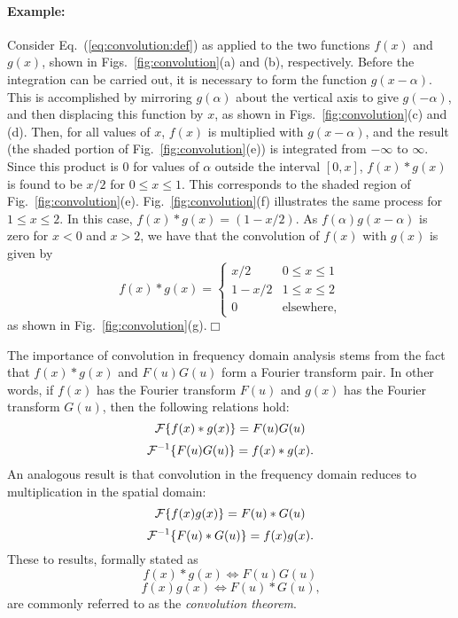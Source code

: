 \paragraph{Example:} Consider Eq.~(\ref{eq:convolution:def}) as applied
to the two functions $f(x)$ and $g(x)$, shown in
Figs.~\ref{fig:convolution}(a) and (b), respectively.  Before the
integration can be carried out, it is necessary to form the function
$g(x-\alpha)$.  This is accomplished by mirroring $g(\alpha)$ about
the vertical axis to give $g(-\alpha)$, and then displacing this
function by $x$, as shown in Figs.~\ref{fig:convolution}(c) and (d).
Then, for all values of $x$, $f(x)$ is multiplied with $g(x-\alpha)$,
and the result (the shaded portion of Fig.~\ref{fig:convolution}(e))
is integrated from $-\infty$ to $\infty$.  Since this product is $0$
for values of $\alpha$ outside the interval $[0,x]$, $f(x)\ast g(x)$
is found to be $x/2$ for $0\leq x\leq 1$.  This corresponds to the
shaded region of Fig.~\ref{fig:convolution}(e).
Fig.~\ref{fig:convolution}(f) illustrates the same process for $1\leq
x\leq 2$.  In this case, $f(x)\ast g(x)=(1-x/2)$.  As
$f(\alpha)g(x-\alpha)$ is zero for $x<0$ and $x>2$, we have that the
convolution of $f(x)$ with $g(x)$ is given by
\begin{equation}
  f(x)\ast g(x)=\left\{\begin{array}{ll}
                         x/2   & 0\leq x\leq 1 \\
                         1-x/2 & 1\leq x\leq 2 \\
                         0     & \mbox{elsewhere,}
                       \end{array}\right.
\end{equation}
as shown in Fig.~\ref{fig:convolution}(g).\hfill$\Box$
\vspace*{0.5cm}

The importance of convolution in frequency domain analysis stems from
the fact that $f(x)\ast g(x)$ and $F(u)G(u)$ form a Fourier transform
pair.  In other words, if $f(x)$ has the Fourier transform $F(u)$ and
$g(x)$ has the Fourier transform $G(u)$, then the following relations
hold:
\begin{equation}
  {\cal F}\{f(x)\ast g(x)\}=F(u)G(u)
\end{equation}
\begin{equation}
  {\cal F}^{-1}\{F(u)G(u)\}=f(x)\ast g(x)\mbox{.}
\end{equation}
An analogous result is that convolution in the frequency domain
reduces to multiplication in the spatial domain:
\begin{equation}
  {\cal F}\{f(x)g(x)\}=F(u)\ast G(u)
\end{equation}
\begin{equation}
  {\cal F}^{-1}\{F(u)\ast G(u)\}=f(x)g(x)\mbox{.}
\end{equation}
These to results, formally stated as
\begin{equation}
  f(x)\ast g(x)\Leftrightarrow F(u)G(u)
\end{equation}
\begin{equation}
  f(x)g(x)\Leftrightarrow F(u)\ast G(u)\mbox{,}
\end{equation}
are commonly referred to as the {\em convolution theorem\/}.

